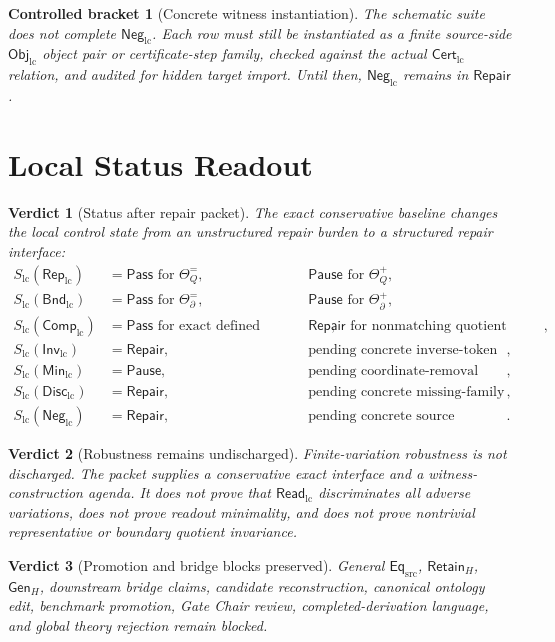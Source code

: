 \documentclass[11pt]{article}
\newcommand{\EqSrc}{\mathsf{Eq}_{\mathrm{src}}}
\newcommand{\ObjLC}{\mathsf{Obj}_{\mathrm{lc}}}
\newcommand{\CertLC}{\mathsf{Cert}_{\mathrm{lc}}}
\newcommand{\ReadLC}{\mathsf{Read}_{\mathrm{lc}}}
\newcommand{\RepLC}{\mathsf{Rep}_{\mathrm{lc}}}
\newcommand{\BndLC}{\mathsf{Bnd}_{\mathrm{lc}}}
\newcommand{\CompLC}{\mathsf{Comp}_{\mathrm{lc}}}
\newcommand{\InvLC}{\mathsf{Inv}_{\mathrm{lc}}}
\newcommand{\MinLC}{\mathsf{Min}_{\mathrm{lc}}}
\newcommand{\DiscLC}{\mathsf{Disc}_{\mathrm{lc}}}
\newcommand{\NegLC}{\mathsf{Neg}_{\mathrm{lc}}}
\newcommand{\RetainH}{\mathsf{Retain}_{H}}
\newcommand{\GenH}{\mathsf{Gen}_{H}}
\newcommand{\Pass}{\mathsf{Pass}}
\newcommand{\Pause}{\mathsf{Pause}}
\newcommand{\Repair}{\mathsf{Repair}}
\newtheorem{bracket}{Controlled bracket}
\newtheorem{verdict}{Verdict}
\begin{document}
\begin{bracket}[Concrete witness instantiation]
The schematic suite does not complete \(\NegLC\). Each row must still
be instantiated as a finite source-side \(\ObjLC\) object pair or
certificate-step family, checked against the actual \(\CertLC\)
relation, and audited for hidden target import. Until then,
\(\NegLC\) remains in \(\Repair\).
\end{bracket}

\section{Local Status Readout}

\begin{verdict}[Status after repair packet]
The exact conservative baseline changes the local control state from
an unstructured repair burden to a structured repair interface:
\[
\begin{aligned}
S_{\mathrm{lc}}(\RepLC)&=\Pass \text{ for } \Theta_Q^{=},
&& \Pause \text{ for } \Theta_Q^{+},\\
S_{\mathrm{lc}}(\BndLC)&=\Pass \text{ for } \Theta_{\partial}^{=},
&& \Pause \text{ for } \Theta_{\partial}^{+},\\
S_{\mathrm{lc}}(\CompLC)&=\Pass \text{ for exact defined composition},
&& \Repair \text{ for nonmatching quotient composition},\\
S_{\mathrm{lc}}(\InvLC)&=\Repair,
&& \text{pending concrete inverse-token witnesses},\\
S_{\mathrm{lc}}(\MinLC)&=\Pause,
&& \text{pending coordinate-removal tests},\\
S_{\mathrm{lc}}(\DiscLC)&=\Repair,
&& \text{pending concrete missing-family witnesses},\\
S_{\mathrm{lc}}(\NegLC)&=\Repair,
&& \text{pending concrete source instantiation}.
\end{aligned}
\]
\end{verdict}

\begin{verdict}[Robustness remains undischarged]
Finite-variation robustness is not discharged. The packet supplies a
conservative exact interface and a witness-construction agenda. It
does not prove that \(\ReadLC\) discriminates all adverse variations,
does not prove readout minimality, and does not prove nontrivial
representative or boundary quotient invariance.
\end{verdict}

\begin{verdict}[Promotion and bridge blocks preserved]
General \(\EqSrc\), \(\RetainH\), \(\GenH\), downstream bridge claims,
candidate reconstruction, canonical ontology edit, benchmark
promotion, Gate Chair review, completed-derivation language, and global
theory rejection remain blocked.
\end{verdict}
\end{document}
